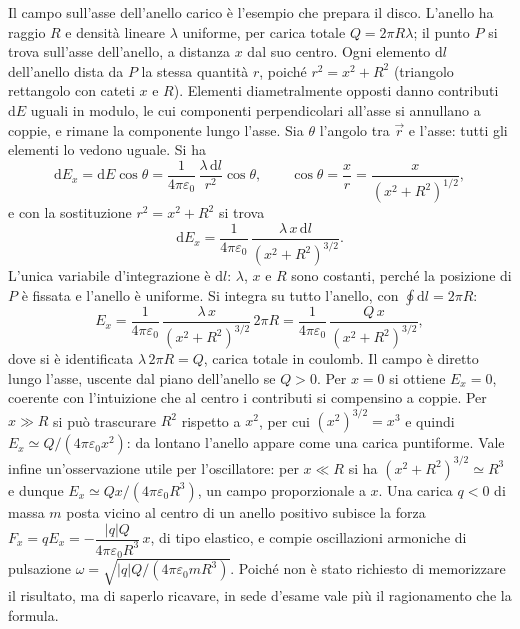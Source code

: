 \documentclass[11pt,a4paper]{article}
\newcommand{\dd}{\mathrm{d}}
\newcommand{\epz}{\varepsilon_0}
\begin{document}
Il campo sull'asse dell'anello carico è l'esempio che prepara il disco. L'anello ha raggio $R$ e densità lineare $\lambda$ uniforme, per carica totale $Q=2\pi R\lambda$; il punto $P$ si trova sull'asse dell'anello, a distanza $x$ dal suo centro. Ogni elemento $\dd l$ dell'anello dista da $P$ la stessa quantità $r$, poiché $r^2=x^2+R^2$ (triangolo rettangolo con cateti $x$ e $R$). Elementi diametralmente opposti danno contributi $\dd E$ uguali in modulo, le cui componenti perpendicolari all'asse si annullano a coppie, e rimane la componente lungo l'asse. Sia $\theta$ l'angolo tra $\vec r$ e l'asse: tutti gli elementi lo vedono uguale. Si ha
\[
\dd E_x=\dd E\cos\theta=\frac{1}{4\pi\epz}\,\frac{\lambda\,\dd l}{r^2}\cos\theta ,\qquad \cos\theta=\frac{x}{r}=\frac{x}{(x^2+R^2)^{1/2}},
\]
e con la sostituzione $r^2=x^2+R^2$ si trova
\[
\dd E_x=\frac{1}{4\pi\epz}\,\frac{\lambda\,x\,\dd l}{(x^2+R^2)^{3/2}} .
\]
L'unica variabile d'integrazione è $\dd l$: $\lambda$, $x$ e $R$ sono costanti, perché la posizione di $P$ è fissata e l'anello è uniforme. Si integra su tutto l'anello, con $\oint \dd l=2\pi R$:
\[
E_x=\frac{1}{4\pi\epz}\,\frac{\lambda\,x}{(x^2+R^2)^{3/2}}\,2\pi R=\frac{1}{4\pi\epz}\,\frac{Q\,x}{(x^2+R^2)^{3/2}} ,
\]
dove si è identificata $\lambda\,2\pi R=Q$, carica totale in coulomb. Il campo è diretto lungo l'asse, uscente dal piano dell'anello se $Q>0$. Per $x=0$ si ottiene $E_x=0$, coerente con l'intuizione che al centro i contributi si compensino a coppie. Per $x\gg R$ si può trascurare $R^2$ rispetto a $x^2$, per cui $(x^2)^{3/2}=x^3$ e quindi $E_x\simeq Q/(4\pi\epz x^2)$: da lontano l'anello appare come una carica puntiforme. Vale infine un'osservazione utile per l'oscillatore: per $x\ll R$ si ha $(x^2+R^2)^{3/2}\simeq R^3$ e dunque $E_x\simeq Qx/(4\pi\epz R^3)$, un campo proporzionale a $x$. Una carica $q<0$ di massa $m$ posta vicino al centro di un anello positivo subisce la forza $F_x=qE_x=-\dfrac{|q|Q}{4\pi\epz R^3}\,x$, di tipo elastico, e compie oscillazioni armoniche di pulsazione $\omega=\sqrt{|q|Q/(4\pi\epz mR^3)}$. Poiché non è stato richiesto di memorizzare il risultato, ma di saperlo ricavare, in sede d'esame vale più il ragionamento che la formula.
\end{document}
